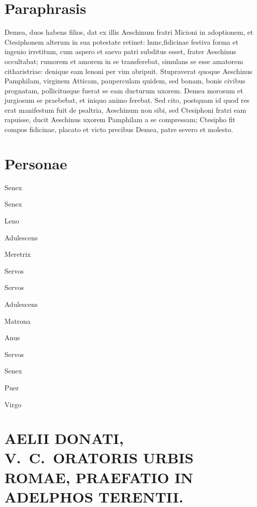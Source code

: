 \section*{Paraphrasis}

Demea, duos habens filios, dat ex illis Aeschinum fratri Micioni in adoptionem, et Ctesiphonem alterum in sua potestate retinet: hunc,fidicinae festiva forma et ingenio irretitum, cum aspero et saevo patri subditus esset, frater Aeschinus occultabat; rumorem et amorem in se transferebat, simulans se esse amatorem citharistriae: denique eam lenoni per vim abripuit. Stupraverat quoque Aeschinus Pamphilam, virginem Atticam, pauperculam quidem, sed bonam, bonis civibus prognatam, pollicitusque fuerat se eam ducturum uxorem. Demea morosum et jurgiosum se praebebat, et iniquo animo ferebat. Sed cito, postquam id quod res erat manifestum fuit de psaltria, Aeschinum non sibi, sed Ctesiphoni fratri eam rapuisse, ducit Aeschinus uxorem Pamphilam a se compressam; Ctesipho fit compos fidicinae, placato et victo precibus Demea, patre severo et molesto.

\section*{Personae}

\begin{description}[noitemsep]
\item[(Prologus)]
\item[Micio] Senex
\item[Demea] Senex
\item[Sannio] Leno
\item[Aeschinus] Adulescens
\item[Bacchis] Meretrix
\item[Parmeno] Servos
\item[Syrus] Servos
\item[Ctesipho] Adulescens
\item[Sostrata] Matrona
\item[Canthara] Anus
\item[Geta] Servos
\item[Hegio] Senex
\item[Dromo] Puer
\item[Pamphila] Virgo
\item[(Cantor)]

\end{description}

\section*{AELII DONATI, V.\ C.\ ORATORIS URBIS ROMAE, PRAEFATIO IN ADELPHOS TERENTII.}

